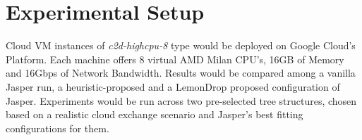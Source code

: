 \documentclass{article}
\begin{document}
\section{Experimental Setup}
Cloud VM instances of \textit{c2d-highcpu-8} type would be deployed on Google Cloud's Platform. 
Each machine offers 8 virtual AMD Milan CPU's, 16GB of Memory and 16Gbps of Network Bandwidth. 
Results would be compared among a vanilla Jasper run, a heuristic-proposed 
and a LemonDrop proposed configuration of Jasper. Experiments would be run across 
two pre-selected tree structures, chosen based on a realistic cloud exchange scenario 
and Jasper's best fitting configurations for them.


    
\end{document}
